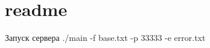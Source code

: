 \chapter{readme}
\hypertarget{md__c_1_2_users_2kruva_2_downloads_2server-main_2readme}{}\label{md__c_1_2_users_2kruva_2_downloads_2server-main_2readme}
Запуск сервера ./main -\/f base.\+txt -\/p 33333 -\/e error.\+txt 